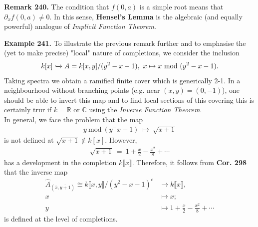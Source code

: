 \documentclass[12pt,a4paper,footinclude=true,headinclude=true]{scrbook} %
\newenvironment{remark}[2][Remark]
    { \begin{mdframed}[backgroundcolor=gray!20] \textbf{#1 #2.} }
    {  \end{mdframed}}
\newenvironment{example}[2][Example]
    { \begin{mdframed}[backgroundcolor=gray!20] \textbf{#1 #2.} }
    {  \end{mdframed}}
\begin{document}
\begin{remark}{240}
    The condition that $f(0,a)$ is a simple root means that $\partial_xf(0,a)\neq0$. In this sense, \textbf{Hensel's Lemma} is the algebraic (and equally powerful) analogue of \textit{Implicit Function Theorem}.
\end{remark}
\newpage
\begin{example}{241}
    To illustrate the previous remark further and to emphasise the (yet to make precise) "local" nature of completions, we consider the inclusion
    \begin{align*}
        k[x]\xhookrightarrow{} A=k[x,y]/(y^2-x-1),\ x\mapsto x\ \mathrm{mod}\ (y^2-x-1).
    \end{align*}
    Taking spectra we obtain a ramified finite cover which is generically 2-1. In a neighbourhood without branching points (e.g. near $(x,y)=(0,-1)$), one should be able to invert this map and to find local sections of this covering \textemdash this is certainly trur if $k=\mathbb{R}$ or $\mathbb{C}$ using the \textit{Inverse Function Theorem}.\\
    In general, we face the problem that the map
    \begin{align*}
        y\ \mathrm{mod}\ (y^-x-1)\ \longmapsto\ \sqrt{x+1}
    \end{align*}
    is not defined at $\sqrt{x+1}\notin k[x]$. However, 
    \begin{align*}
        \sqrt{x+1}\ =\ 1+\tfrac{x}{2}-\tfrac{x^2}{8}+\cdots
    \end{align*}
    has a development in the completion $k\llbracket x\rrbracket$. Therefore, it follows from \textbf{Cor. 298} that the inverse map
    \begin{align*}
        \widehat{A}_{(\overline{x},\overline{y+1})}\cong k\llbracket x,y\rrbracket/(y^2-x-1)^e &\to k\llbracket x\rrbracket,\\
        x &\mapsto x;\\ y &\mapsto 1+\tfrac{x}{2}-\tfrac{x^2}{8}+\cdots
    \end{align*}
    is defined at the level of completions.
\end{example}
\newpage
\end{document}
